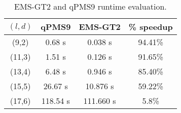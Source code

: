 \begin{table}[h] %
	\renewcommand{\arraystretch}{1.3}
	\centering
	\begin{tabular}{|c|c|c|c|}
	\hline 
	\bfseries\boldmath $(l,d)$ & 
	\bfseries qPMS9 & 
	\bfseries\boldmath EMS-GT2 & 
	\bfseries \% speedup\\
	\hline
	 (9,2) &   0.68 s &    0.038 s &   94.41\%\\
	(11,3) &   1.51 s &    0.126 s &   91.65\%\\
	(13,4) &   6.48 s &    0.946 s &   85.40\%\\
	(15,5) &  26.67 s &   10.876 s &   59.22\%\\
	(17,6) & 118.54 s &  111.660 s &   5.8\%\\
	\hline\end{tabular}
	
	\caption{EMS-GT2 and qPMS9 runtime evaluation.}
	\label{tbl:final-results}
\end{table}


